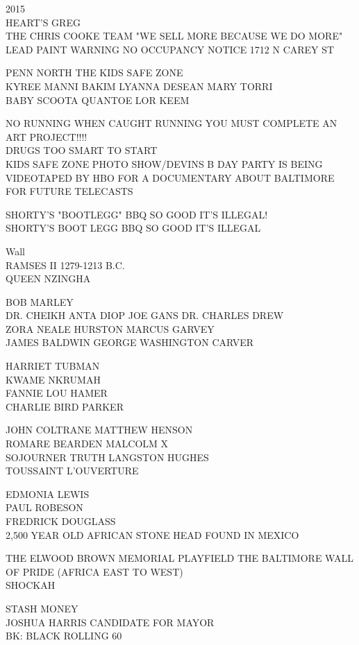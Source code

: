 \documentclass[10pt,letterpaper]{article}
\begin{document}
2015\\
HEART'S GREG\\
THE CHRIS COOKE TEAM "WE SELL MORE BECAUSE WE DO MORE"\\
LEAD PAINT WARNING NO OCCUPANCY NOTICE 1712 N CAREY ST

PENN NORTH THE KIDS SAFE ZONE\\
KYREE MANNI BAKIM LYANNA DESEAN MARY TORRI\\
BABY SCOOTA QUANTOE LOR KEEM

NO RUNNING WHEN CAUGHT RUNNING YOU MUST COMPLETE AN ART PROJECT!!!!\\
DRUGS TOO SMART TO START\\
KIDS SAFE ZONE PHOTO SHOW/DEVINS B DAY PARTY IS BEING VIDEOTAPED BY HBO FOR A DOCUMENTARY ABOUT BALTIMORE FOR FUTURE TELECASTS

SHORTY'S "BOOTLEGG" BBQ SO GOOD IT'S ILLEGAL!\\
SHORTY'S BOOT LEGG BBQ SO GOOD IT'S ILLEGAL

Wall\\
RAMSES II 1279{-}1213 B.C.\\
QUEEN NZINGHA

BOB MARLEY\\
DR. CHEIKH ANTA DIOP JOE GANS DR. CHARLES DREW\\
ZORA NEALE HURSTON MARCUS GARVEY\\
JAMES BALDWIN GEORGE WASHINGTON CARVER

HARRIET TUBMAN\\
KWAME NKRUMAH\\
FANNIE LOU HAMER\\
CHARLIE BIRD PARKER

JOHN COLTRANE MATTHEW HENSON\\
ROMARE BEARDEN MALCOLM X\\
SOJOURNER TRUTH LANGSTON HUGHES\\
TOUSSAINT L'OUVERTURE

EDMONIA LEWIS\\
PAUL ROBESON\\
FREDRICK DOUGLASS\\
2,500 YEAR OLD AFRICAN STONE HEAD FOUND IN MEXICO

THE ELWOOD BROWN MEMORIAL PLAYFIELD THE BALTIMORE WALL OF PRIDE (AFRICA EAST TO WEST)\\
SHOCKAH

STASH MONEY\\
JOSHUA HARRIS CANDIDATE FOR MAYOR\\
BK: BLACK ROLLING 60
\end{document}
